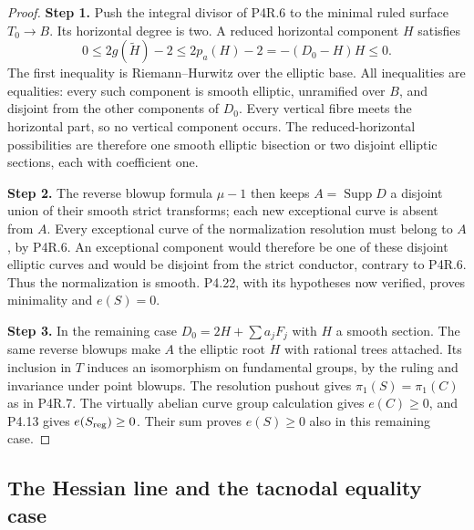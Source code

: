 \begin{proof}
\noindent\textbf{Step 1.} Push the integral divisor of P4R.6 to
the minimal ruled surface $T_0\to B$.
Its horizontal degree is two. A reduced
horizontal component $H$ satisfies
\[
 0\le 2g(\widetilde H)-2
 \le 2p_a(H)-2
 =-(D_0-H)H\le0.
\]
The first inequality is
Riemann--Hurwitz over the elliptic
base. All inequalities are equalities:
every such component is smooth elliptic,
unramified over $B$, and disjoint from
the other components of $D_0$. Every
vertical fibre meets the horizontal
part, so no vertical component occurs.
The reduced-horizontal possibilities
are therefore one smooth elliptic
bisection or two disjoint elliptic
sections, each with coefficient one.

\noindent\textbf{Step 2.} The reverse blowup formula $\mu-1$
then keeps $A=\operatorname{Supp}D$
a disjoint union of their smooth
strict transforms; each new exceptional
curve is absent from $A$. Every
exceptional curve of the normalization
resolution must belong to $A$, by
P4R.6. An exceptional component would
therefore be one of these disjoint
elliptic curves and would be disjoint
from the strict conductor, contrary
to P4R.6. Thus the normalization is
smooth. P4.22, with its hypotheses now
verified, proves minimality and
$e(S)=0$.

\noindent\textbf{Step 3.} In the remaining case
$D_0=2H+\sum a_jF_j$ with $H$ a
smooth section. The same reverse
blowups make $A$ the elliptic root $H$
with rational trees attached. Its
inclusion in $T$ induces an
isomorphism on fundamental groups,
by the ruling and invariance under
point blowups. The resolution pushout
gives $\pi_1(S)=\pi_1(C)$ as in
P4R.7. The virtually abelian curve
group calculation gives $e(C)\ge0$,
and P4.13 gives $e(S_{\rm reg})\ge0$.
Their sum proves $e(S)\ge0$ also
in this remaining case.
\end{proof}
\subsection{The Hessian line and the tacnodal equality case}

